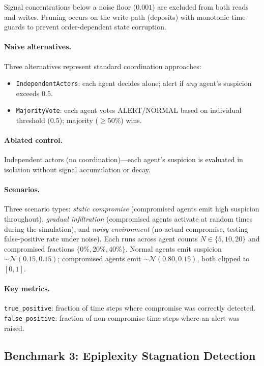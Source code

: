 Signal concentrations below a noise floor ($0.001$) are excluded from
both reads and writes.  Pruning occurs on the write path (deposits)
with monotonic time guards to prevent order-dependent state corruption.

\paragraph{Naive alternatives.}
Three alternatives represent standard coordination approaches:
\begin{itemize}[nosep]
  \item \texttt{IndependentActors}: each agent decides alone; alert if
        \emph{any} agent's suspicion exceeds $0.5$.
  \item \texttt{MajorityVote}: each agent votes ALERT/NORMAL based on
        individual threshold ($0.5$); majority ($\geq 50\%$) wins.
\end{itemize}

\paragraph{Ablated control.}
Independent actors (no coordination)---each agent's suspicion is
evaluated in isolation without signal accumulation or decay.

\paragraph{Scenarios.}
Three scenario types: \emph{static compromise} (compromised agents emit
high suspicion throughout), \emph{gradual infiltration} (compromised
agents activate at random times during the simulation), and
\emph{noisy environment} (no actual compromise, testing false-positive
rate under noise).  Each runs across agent counts $N \in \{5, 10, 20\}$
and compromised fractions $\{0\%, 20\%, 40\%\}$.  Normal agents emit
suspicion $\sim \mathcal{N}(0.15, 0.15)$; compromised agents emit
$\sim \mathcal{N}(0.80, 0.15)$, both clipped to $[0, 1]$.

\paragraph{Key metrics.}
\texttt{true\_positive}: fraction of time steps where compromise was
correctly detected.  \texttt{false\_positive}: fraction of
non-compromise time steps where an alert was raised.

\subsection{Benchmark 3: Epiplexity Stagnation Detection}


